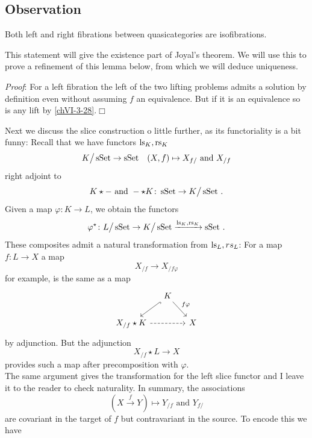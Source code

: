     \subsection{Observation}\label{chVI-3-38}
        Both left and right fibrations between quasicategories are isofibrations.
        \medskip

        This statement will give the existence part of Joyal's theorem. We will use this to prove a refinement of this lemma below, from which we will deduce uniqueness.
        \smallskip

        \emph{Proof}: For a left fibration the left of the two lifting problems admits a solution by definition even without assuming $f$ an equivalence. But if it is an equivalence so is any lift by \ref{chVI-3-28}.\hfill$\Box$
        \medskip

        Next we discuss the slice construction o little further, as its functoriality is a bit funny: Recall that we have functors $\operatorname{ls}_K, \operatorname{rs}_K$
        \begin{equation*}
            K \big/ \operatorname{sSet} \to \operatorname{sSet} \quad (X, f) \mapsto X_{f/} \text{ and } X_{/f}
        \end{equation*}
        right adjoint to
        \begin{equation*}
            K \star - \text{ and } - \star K \colon \operatorname{sSet} \to K \big/ \operatorname{sSet} \,.
        \end{equation*}
        Given a map $\varphi \colon K \to L$, we obtain the functors
        \begin{equation*}
            \varphi^\star \colon L \big/ \operatorname{sSet} \to K \big/ \operatorname{sSet} \xrightarrow{\operatorname{ls}_K, \operatorname{rs}_K} \operatorname{sSet} \,.
        \end{equation*}	
        These composites admit a natural transformation from $\operatorname{ls}_L, rs_L$: For a map $f \colon L \to X$ a map
        \begin{equation*}
            X_{/f} \to X_{/f \varphi}
        \end{equation*}
        for example, is the same as a map
        \begin{equation*}
            \begin{tikzcd}[column sep=small]
                & K \arrow[ld, hook] \arrow[rd, "f \varphi"] & \\
                X_{/f} \star K \arrow[rr, dashed] & & X 
            \end{tikzcd}	
        \end{equation*}		
        by adjunction. But the adjunction
        \begin{equation*}
            X_{/f} \star L \to X
        \end{equation*}
        provides such a map after precomposition with $\varphi$.\\
        The same argument gives the transformation for the left slice functor and I leave it to the reader to check naturality. In summary, the associations
        \begin{equation*}
            (X \xrightarrow{f} Y) \mapsto Y_{/f} \text{ and } Y_{f/}
        \end{equation*}
        are covariant in the target of $f$ but contravariant in the source. To encode this we have

